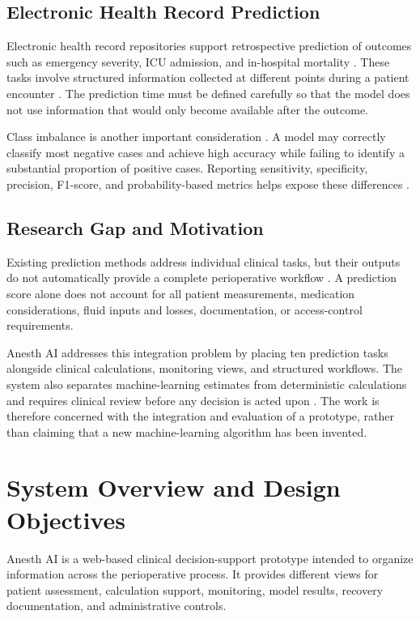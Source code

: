 \documentclass[conference]{IEEEtran}
\begin{document}
\subsection{Electronic Health Record Prediction}
Electronic health record repositories support retrospective prediction of outcomes such as emergency severity, ICU admission, and in-hospital mortality \cite{ref8,ref9}. These tasks involve structured information collected at different points during a patient encounter \cite{ref12,ref14}. The prediction time must be defined carefully so that the model does not use information that would only become available after the outcome.

Class imbalance is another important consideration \cite{ref18,ref23}. A model may correctly classify most negative cases and achieve high accuracy while failing to identify a substantial proportion of positive cases. Reporting sensitivity, specificity, precision, F1-score, and probability-based metrics helps expose these differences \cite{ref19,ref21}.

\subsection{Research Gap and Motivation}
Existing prediction methods address individual clinical tasks, but their outputs do not automatically provide a complete perioperative workflow \cite{ref4,ref11}. A prediction score alone does not account for all patient measurements, medication considerations, fluid inputs and losses, documentation, or access-control requirements.

Anesth AI addresses this integration problem by placing ten prediction tasks alongside clinical calculations, monitoring views, and structured workflows. The system also separates machine-learning estimates from deterministic calculations and requires clinical review before any decision is acted upon \cite{ref11,ref15}. The work is therefore concerned with the integration and evaluation of a prototype, rather than claiming that a new machine-learning algorithm has been invented.

\section{System Overview and Design Objectives}
Anesth AI is a web-based clinical decision-support prototype intended to organize information across the perioperative process. It provides different views for patient assessment, calculation support, monitoring, model results, recovery documentation, and administrative controls.
\end{document}
